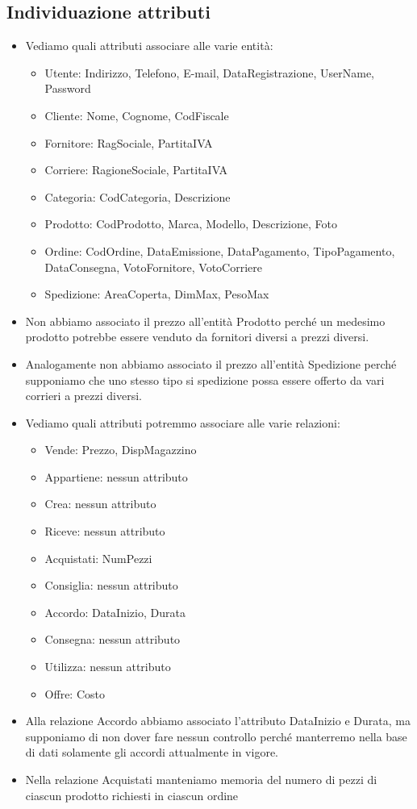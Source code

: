 \subsection{Individuazione attributi}
\begin{itemize}
	\item Vediamo quali attributi associare alle varie entità: 
	\begin{itemize}
		\item Utente: Indirizzo, Telefono, E-mail,
		DataRegistrazione, UserName, Password
		\item Cliente: Nome, Cognome, CodFiscale
		\item Fornitore: RagSociale, PartitaIVA
		\item Corriere: RagioneSociale, PartitaIVA
		\item Categoria: CodCategoria, Descrizione \item Prodotto: CodProdotto, Marca, Modello, Descrizione, Foto
		\item Ordine: CodOrdine, DataEmissione, DataPagamento, TipoPagamento, DataConsegna, VotoFornitore, VotoCorriere
		\item Spedizione: AreaCoperta, DimMax, PesoMax
	\end{itemize}
	\item Non abbiamo associato il prezzo all’entità Prodotto perché un medesimo prodotto potrebbe essere venduto da fornitori diversi a prezzi diversi. 
	\item Analogamente non abbiamo associato il prezzo all’entità Spedizione perché supponiamo che uno stesso tipo si spedizione possa essere offerto da vari corrieri a prezzi diversi.
	\item Vediamo quali attributi potremmo associare alle varie relazioni:
	\begin{itemize}
		\item Vende: Prezzo, DispMagazzino
		\item Appartiene: nessun attributo
		\item Crea: nessun attributo
		\item Riceve: nessun attributo
		\item Acquistati: NumPezzi 
		\item Consiglia: nessun attributo
		\item Accordo: DataInizio, Durata
		\item Consegna: nessun attributo
		\item Utilizza: nessun attributo 
		\item Offre: Costo
	\end{itemize}
	\item Alla relazione Accordo abbiamo associato l’attributo DataInizio e Durata, ma supponiamo di non dover fare nessun controllo perché manterremo nella base di dati solamente gli accordi attualmente in vigore.
	\item Nella relazione Acquistati manteniamo memoria del numero di pezzi di ciascun prodotto richiesti in ciascun ordine
\end{itemize}
